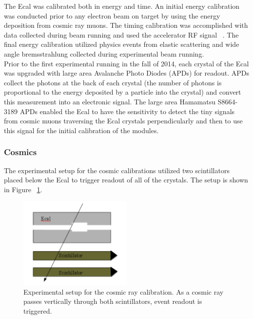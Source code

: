 \documentclass[twoside]{article}
\begin{document}
\begin{multicols}{2}
The Ecal was calibrated both in energy and time. An initial energy calibration was conducted prior to any electron beam on target by using the energy deposition from cosmic ray muons. The timing calibration was accomplished with data collected during beam running and used the accelerator RF signal ~\cite{Szumila}. The final energy calibration utilized physics events from elastic scattering and wide angle bremsstrahlung collected during experimental beam running.  \\
\indent Prior to the first experimental running in the fall of 2014, each crystal of the Ecal was upgraded with large area Avalanche Photo Diodes (APDs) for readout. APDs collect the photons at the back of each crystal (the number of photons is proportional to the energy deposited by a particle into the crystal) and convert this measurement into an electronic signal. The large area Hamamatsu S8664-3189 APDs enabled the Ecal to have the sensitivity to detect the tiny signals from cosmic muons traversing the Ecal crystals perpendicularly and then to use this signal for the initial calibration of the modules. 

\subsubsection{Cosmics}

The experimental setup for the cosmic calibrations utilized two scintillators placed below the Ecal to trigger readout of all of the crystals. The setup is shown in Figure ~\ref{cosmicSetup}.

\begin{figure}[H]
  \centering
      \includegraphics[width=0.5\textwidth]{pics/cosmicsetup.png}
  \caption{Experimental setup for the cosmic ray calibration. As a cosmic ray passes vertically through both scintillators, event readout is triggered.}
  \label{cosmicSetup}
\end{figure}



\end{multicols}
\end{document}
